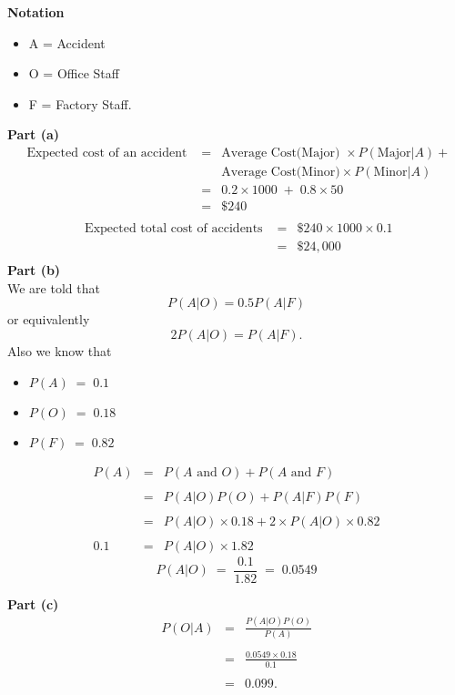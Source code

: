 \documentclass[a4paper,12pt]{article}
\begin{document}
\noindent \textbf{Notation}
\begin{itemize}
\item A = Accident
\item O = Office Staff 
\item F = Factory Staff.
\end{itemize}
\medskip 
\noindent \textbf{Part (a) }\begin{eqnarray*}
\mbox{ Expected cost of an accident } &=& \mbox{Average Cost(Major) } \times P(\mbox{Major}|A)
+  \\ 
& &  \mbox{Average Cost(Minor)}  \times P(\mbox{Minor}|A)\\
&=& 0.2\times 1000 \;+\; 0.8 \times 50 \\
&=& \$240 \\ 
\end{eqnarray*}
\begin{eqnarray*}
\mbox{ Expected total cost of accidents } &=&
\$ 240 \times 1000 \times  0.1\\
&=& \$24,000 \\
\end{eqnarray*}
\newpage
\noindent \textbf{Part (b) }\\
We are told that \[P(A|O) = 0.5 P(A|F)\] or equivalently \[2 P(A|O) = P(A|F).\]
Also we know that 
\begin{itemize}
    \item $P(A) \;=\; 0.1$
    \item $P(O) \;=\; 0.18$
    \item $P(F) \;=\; 0.82$
\end{itemize}
\begin{eqnarray*}
P(A) &=& P(A \mbox{ and } O)+P(A \mbox{ and }F)\\
& & \\
&=& P(A|O)P(O)+P(A|F)P(F) \\ & & \\ &=& P(A|O)\times 0.18 + 2\times P(A|O)\times 0.82 \\
& & \\
0.1 &=& P(A|O) \times 1.82
\end{eqnarray*}
\[P(A|O) \;=\; \frac{0.1 }{1.82} \;=\;  0.0549\]


\noindent \textbf{Part (c) }
\begin{eqnarray*}
P(O|A) &=& \frac{P ( A | O ) P ( O )}{P ( A )}\\ 
& &  \\
&=& \frac{0.0549\times 0.18}{0.1}\\
& &  \\
&=&  0.099.\\
\end{eqnarray*}
\end{document}
